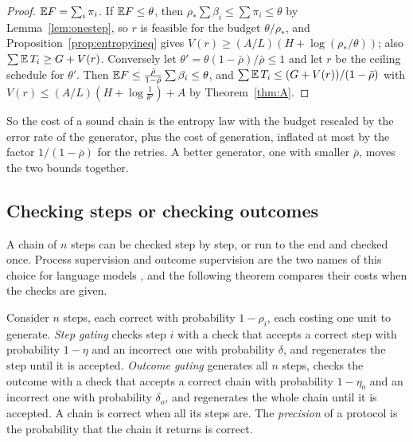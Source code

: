 \begin{proof}
$\mathbb{E} F=\sum_{i}\pi_{i}$. If $\mathbb{E} F\le\theta$, then $\rho_{\ast}\sum\beta_{i}\le\sum\pi_{i}\le\theta$ by Lemma~\ref{lem:onestep}, so $r$ is feasible for the budget $\theta/\rho_{\ast}$, and Proposition~\ref{prop:entropyineq} gives $V(r)\ge(A/L)(H+\log(\rho_{\ast}/\theta))$; also $\sum\mathbb{E}\,T_{i}\ge G+V(r)$. Conversely let $\theta'=\theta(1-\bar\rho)/\bar\rho\le1$ and let $r$ be the ceiling schedule for $\theta'$. Then $\mathbb{E} F\le\frac{\bar\rho}{1-\bar\rho}\sum\beta_{i}\le\theta$, and $\sum\mathbb{E}\,T_{i}\le(G+V(r))/(1-\bar\rho)$ with $V(r)\le(A/L)(H+\log\frac1{\theta'})+A$ by Theorem~\ref{thm:A}.
\end{proof}

So the cost of a sound chain is the entropy law with the budget rescaled by the error rate of the generator, plus the cost of generation, inflated at most by the factor $1/(1-\bar\rho)$ for the retries. A better generator, one with smaller $\bar\rho$, moves the two bounds together.

\subsection{Checking steps or checking outcomes}

A chain of $n$ steps can be checked step by step, or run to the end and checked once. Process supervision and outcome supervision are the two names of this choice for language models \cite{UKK22,LKB23}, and the following theorem compares their costs when the checks are given.

Consider $n$ steps, each correct with probability $1-\rho_{i}$, each costing one unit to generate. \emph{Step gating} checks step $i$ with a check that accepts a correct step with probability $1-\eta$ and an incorrect one with probability $\delta$, and regenerates the step until it is accepted. \emph{Outcome gating} generates all $n$ steps, checks the outcome with a check that accepts a correct chain with probability $1-\eta_{o}$ and an incorrect one with probability $\delta_{o}$, and regenerates the whole chain until it is accepted. A chain is correct when all its steps are. The \emph{precision} of a protocol is the probability that the chain it returns is correct.

